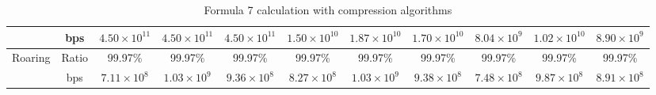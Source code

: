 \begin{table}[h]
{\begin{tabular}{|c|c|c|c|c|c|c|c|c|c|c|}
\cline{2-11}
& bps & $4.50 \times 10^{11}$ & $4.50 \times 10^{11}$ & $4.50 \times 10^{11}$ & $1.50 \times 10^{10}$ & $1.87 \times 10^{10}$ & $1.70 \times 10^{10}$ & $8.04 \times 10^{9}$ & $1.02 \times 10^{10}$ & $8.90 \times 10^{9}$ \\
\hline
\multirow{2}{*}{Roaring} & Ratio & 99.97\% & 99.97\% & 99.97\% & 99.97\% & 99.97\% & 99.97\% & 99.97\% & 99.97\% & 99.97\% \\
\cline{2-11}
& bps & $7.11 \times 10^{8}$ & $1.03 \times 10^{9}$ & $9.36 \times 10^{8}$ & $8.27 \times 10^{8}$ & $1.03 \times 10^{9}$ & $9.38 \times 10^{8}$ & $7.48 \times 10^{8}$ & $9.87 \times 10^{8}$ & $8.91 \times 10^{8}$ \\
\hline
\end{tabular}
}
\caption{Formula 7 calculation with compression algorithms}
\label{tbl:formulacompress7}
\end{table}


